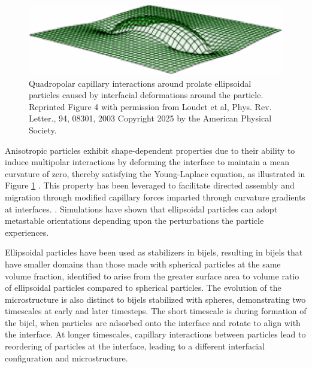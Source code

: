 \begin{figure}
    \centering
    \includegraphics[scale = 0.5]{figures/literature_review/interfacial_curvature.png}
    \caption{Quadropolar capillary interactions around prolate ellipsoidal particles caused by interfacial deformations 
             around the particle. \cite{loudet_capillary_2005} Reprinted Figure 4 with permission from
             Loudet et al, Phys. Rev. Letter., 94, 08301, 2003 Copyright 2025 by the American Physical Society.}
    \label{fig:anisotropic_particle_interface}
\end{figure}

Anisotropic particles exhibit shape-dependent properties due to their ability to induce multipolar interactions by deforming the interface to maintain a mean curvature of 
zero, thereby satisfying the Young-Laplace equation, as illustrated in Figure \ref{fig:anisotropic_particle_interface} \cite{loudet_capillary_2005, cheng_shape-anisotropic_2013}.
This property has been leveraged to facilitate directed assembly and migration through modified capillary forces imparted through curvature gradients at interfaces.
\cite{cavallaro_curvature-driven_2011, read_dimerization_2020, sharifi-mood_curvature_2015}. Simulations have shown that ellipsoidal particles can adopt metastable orientations depending upon the perturbations 
the particle experiences. \cite{gunther_lattice_2013}

Ellipsoidal particles have been used as stabilizers in bijels, resulting in bijels that have smaller domains than those made with spherical particles
at the same volume fraction, identified to arise from the  greater surface area to volume ratio of ellipsoidal particles compared to spherical particles. 
\cite{gunther_timescales_2014} The evolution of the microstructure is also distinct to bijels stabilized with spheres, demonstrating two timescales at
early and later timesteps. \cite{gunther_timescales_2014} The short timescale is during formation of the bijel, when particles are adsorbed onto the
interface and rotate to align with the interface. At longer timescales, capillary interactions between particles lead to reordering of particles
at the interface, leading to a different interfacial configuration and microstructure. \cite{gunther_timescales_2014}

